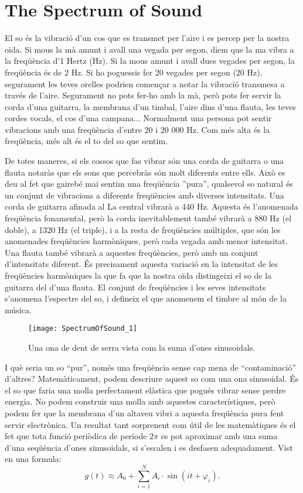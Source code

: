 \section{The Spectrum of Sound}

El so és la vibració d'un cos que es transmet per l'aire i es percep per la nostra oïda. Si mous la mà amunt i avall una vegada per segon, diem que la ma vibra a la freqüència d'1 Hertz (Hz). Si la mous amunt i avall dues vegades per segon, la freqüència és de 2 Hz. Si ho poguessis fer 20 vegades per segon (20 Hz), segurament les teves orelles podrien començar a notar la vibració transmesa a través de l'aire. Segurament no pots fer-ho amb la mà, però pots fer servir la corda d'una guitarra, la membrana d'un timbal, l'aire dins d'una flauta, les teves cordes vocals, el cos d'una campana... Normalment una persona pot sentir vibracions amb una freqüència d'entre 20 i 20 000 Hz. Com més alta és la freqüència, més alt és el to del so que sentim.

De totes maneres, si els cossos que fas vibrar són una corda de guitarra o una flauta notaràs que els sons que percebràs són molt diferents entre ells. Això es deu al fet que gairebé mai sentim una freqüència ''pura'', qualsevol so natural és un conjunt de vibracions a diferents freqüències amb diverses intensitats. Una corda de guitarra afinada al La central vibrarà a 440 Hz. Aquesta és l'anomenada freqüència fonamental, però la corda inevitablement també vibrarà a 880 Hz (el doble), a 1320 Hz (el triple), i a la resta de freqüències múltiples, que són les anomenades freqüències harmòniques, però cada vegada amb menor intensitat. Una flauta també vibrarà a aquestes freqüències, però amb un conjunt d'intensitats diferent. És precisament aquesta variació en la intensitat de les freqüències harmòniques la que fa que la nostra oïda distingeixi el so de la guitarra del d'una flauta. El conjunt de freqüències i les seves intensitats s'anomena l'espectre del so, i defineix el que anomenem el timbre al món de la música.

\begin{wrapfigure}[15]{l}{0.35\textwidth}
\centering
\texttt{[image: SpectrumOfSound\_1]}
\caption*{Una ona de dent de serra vista com la suma d'ones sinusoidals.}
\end{wrapfigure}

I què seria un so ``pur'', només una freqüència sense cap mena de ``contaminació'' d'altres? Matemàticament, podem descriure aquest so com una ona sinusoidal. És el so que faria una molla perfectament elàstica que pogués vibrar sense perdre energia. No podem construir una molla amb aquestes característiques, però podem fer que la membrana d'un altaveu vibri a aquesta freqüència pura fent servir electrònica. Un resultat tant sorprenent com útil de les matemàtiques és el fet que tota funció periòdica de període $2\pi$ es pot aproximar amb una suma d'una seqüència d'ones sinusoidals, si s'escalen i es desfasen adequadament. Vist en una formula:
$$g(t) \approx A_0 + \sum_{i=1}^N A_i \cdot \sin(i t + \varphi_i).$$


